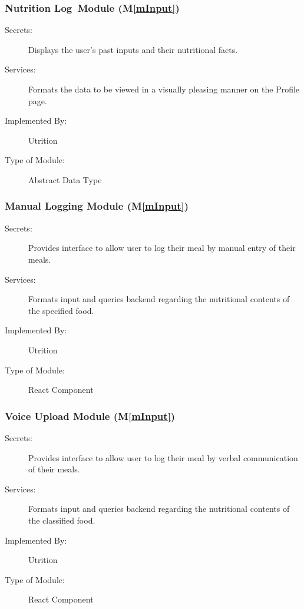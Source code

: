 \documentclass[12pt, titlepage]{article}
\newcommand{\mref}[1]{M\ref{#1}}
\begin{document}
\subsubsection{Nutrition Log Module (\mref{mInput})}

\begin{description}
	\item[Secrets:]Displays the user's past inputs and their nutritional facts.
	\item[Services:]Formats the data to be viewed in a visually pleasing manner 
	on the Profile page.
	\item[Implemented By:] Utrition
	\item[Type of Module:] Abstract Data Type
	
\end{description}

\subsubsection{Manual Logging Module (\mref{mInput})}

\begin{description}
\item[Secrets:]Provides interface to allow user to log their meal by manual 
entry of their meals.
\item[Services:]Formats input and queries backend regarding the nutritional 
contents of the specified food.
\item[Implemented By:] Utrition
\item[Type of Module:] React Component
\end{description}

\subsubsection{Voice Upload Module (\mref{mInput})}

\begin{description}
\item[Secrets:]Provides interface to allow user to log their meal by verbal 
communication of their meals.
\item[Services:]Formats input and queries backend regarding the nutritional 
contents of the classified food.
\item[Implemented By:] Utrition
\item[Type of Module:] React Component
\end{description}
\end{document}
